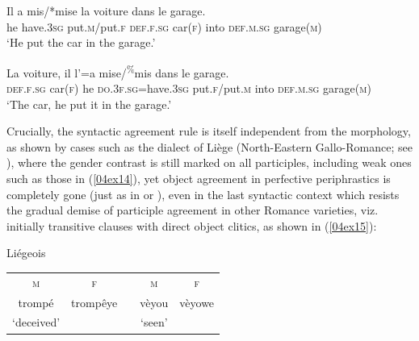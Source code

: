\documentclass[output=paper,colorlinks,citecolor=brown]{langscibook}
\begin{document}
\largerpage[1]

\begin{exe}
	\ex \label{04ex13}  \citep{guastirizzi2002}
	\begin{xlist}
		\ex \label{04ex13a}
		\gll Il a mis/*mise la voiture dans le garage. \\
		he have.\textsc{3sg} put.\textsc{m}/put.\textsc{f} \textsc{def.f.sg} car(\textsc{f}) into \textsc{def.m.sg} garage(\textsc{m}) \\
		\trans ‘He put the car in the garage.’
		
		\ex \label{04ex13b}
		\gll La voiture, il l’=a mise/\textsuperscript{\%}mis dans le garage. \\
		\textsc{def.f.sg} car(\textsc{f}) he \textsc{do.3f.sg}=have.\textsc{3sg} put.\textsc{\textsc{f}}/put.\textsc{\textsc{m}} into \textsc{def.m.sg} garage(\textsc{m}) \\
		\trans ‘The car, he put it in the garage.’
	\end{xlist}
\end{exe}

Crucially, the syntactic agreement rule is itself independent from the morphology, as shown by cases such as the  dialect of Liège (North-Eastern Gallo-Romance; see \citealt[148]{remacle1956}), where the gender contrast is still marked on all participles, including weak ones such as those in (\ref{04ex14}), yet object agreement in perfective periphrastics is completely gone (just as in  or ), even in the last syntactic context which resists the gradual demise of participle agreement in other Romance varieties, viz. initially transitive clauses with direct object clitics, as shown in (\ref{04ex15}):

\begin{exe}
	\ex \label{04ex14} Liégeois \\
	\begin{tabularx}{\textwidth}{llp{0.5cm}lp{2cm}}
			\multicolumn{1}{c}{\textsc{m}} & \multicolumn{1}{c}{\textsc{f}} & & \multicolumn{1}{c}{\textsc{m}} & \multicolumn{1}{c}{\textsc{f}} \\
			\cline{1-2}\cline{4-5}
			\multicolumn{1}{|c|}{trompé} & \multicolumn{1}{c|}{trompêye} & & \multicolumn{1}{|c|}{vèyou} & \multicolumn{1}{c|}{vèyowe} \\
			\cline{1-2}\cline{4-5}
			\multicolumn{1}{c}{\rule{0pt}{0.5cm}‘deceived’} & & & \multicolumn{1}{c}{\rule{0pt}{0.5cm}‘seen’} & \\
	\end{tabularx}
\end{exe}
\end{document}
